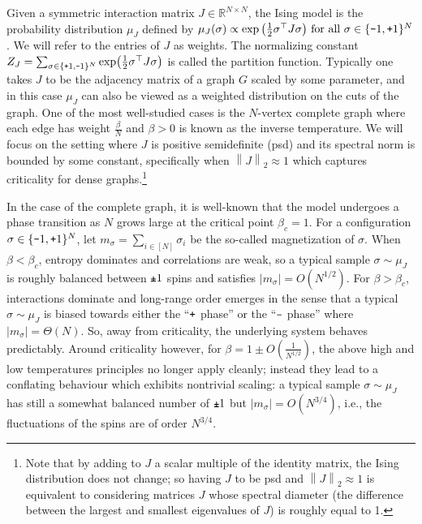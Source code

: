 \documentclass[11pt]{article}
\newcommand\norm[1]{\left\|{#1}\right\|}
\newcommand{\pl}{\textup{\texttt{+}}}
\newcommand{\mi}{\textup{\texttt{-}}}
\newcommand{\plm}{\textup{\texttt{\textpm}}}
\begin{document}
Given a symmetric interaction matrix \(J \in \mathbb{R}^{N \times N}\), the Ising model is the probability distribution \(\mu_J\)  defined by $\mu_J(\sigma) \propto \exp\big(\tfrac{1}{2}\sigma^\top J \sigma\big) \mbox{ for all } \sigma\in \{\mi1,\pl1\}^N$. We will refer to the entries of $J$ as  weights. The normalizing constant $Z_J = \sum_{\sigma \in \{\pl1,\mi1\}^N} \exp\!\left(\frac{1}{2}\sigma^\top J \sigma\right)$
is called the partition function.  Typically one takes $J$ to be the adjacency matrix of a graph $G$ scaled by some parameter, and in this case $\mu_J$ can also be viewed as a weighted distribution on the cuts of the graph. One of the most well-studied cases is the $N$-vertex complete graph where each edge has weight $\frac{\beta}{N}$ and $\beta>0$ is known as the inverse temperature. We will focus on the setting where $J$ is positive semidefinite (psd) and its spectral norm is bounded by some constant, specifically  when  $\norm{J}_2\approx 1$ which captures criticality for dense graphs.\footnote{\label{fn:psd}Note that by adding to $J$ a scalar multiple of the identity matrix, the Ising distribution does not change;  so having $J$ to be psd and $\norm{J}_2\approx 1$  is equivalent to considering matrices $J$ whose spectral diameter (the difference between the largest and smallest eigenvalues of $J$) is roughly equal to 1.} 

In the case of the complete graph, it is well-known that the model undergoes a phase transition as $N$ grows large at the critical point $\beta_c=1$. For a configuration $\sigma\in \{\mi 1,\pl 1\}^N$, let   $m_\sigma=\sum_{i\in [N]} \sigma_i$ be the so-called magnetization of $\sigma$. When $\beta<\beta_c$, entropy dominates and correlations are weak, so a typical sample $\sigma\sim\mu_J$ is roughly balanced between $\plm 1$ spins and satisfies $|m_\sigma|=O( N^{1/2})$. For $\beta>\beta_c$,  interactions dominate and long-range order emerges in the sense that a typical $\sigma\sim \mu_J$ is biased towards either the ``$\pl$ phase'' or the ``$\mi$ phase'' where  $|m_\sigma|=\Theta(N)$. So, away from criticality, the underlying system behaves predictably. Around criticality however, for $\beta=1\pm O(\tfrac{1}{N^{1/2}})$, the above high and low temperatures principles no longer apply cleanly; instead they lead to a conflating behaviour which exhibits nontrivial scaling:  a typical sample $\sigma\sim \mu_J$ has  still a somewhat balanced number of $\plm 1$ but $|m_\sigma|=O( N^{3/4})$, i.e., the fluctuations of the spins are of order $N^{3/4}$. 
\end{document}
